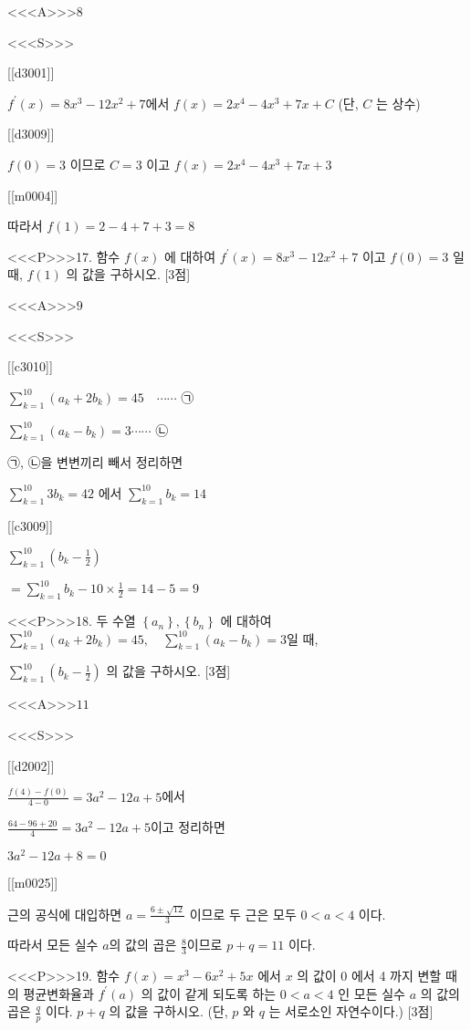 \documentclass{oblivoir}
\begin{document}
<<<A>>>$8$

<<<S>>>

[[d3001]]

$f^{\prime}(x)=8 x^{3}-12 x^{2}+7$에서
$f(x)=2 x^{4}-4 x^{3}+7 x+C $ (단, $C$ 는 상수)

[[d3009]]

$ f(0)=3 $ 이므로 $C=3 $ 이고 $ f(x)=2 x^{4}-4 x^{3}+7 x+3$ 

[[m0004]]

따라서 $f(1)=2-4+7+3=8$


<<<P>>>17. 함수 $f(x)$ 에 대하여 $f^{\prime}(x)=8 x^{3}-12 x^{2}+7$ 이고 $f(0)=3$ 일 때, $f(1)$ 의 값을 구하시오. [3점]

<<<A>>>$9$

<<<S>>>

[[c3010]]

$ \sum_{k=1}^{10}\left(a_{k}+2 b_{k}\right)=45 \quad \cdots \cdots$ ㉠

$\sum_{k=1}^{10}\left(a_{k}-b_{k}\right)=3 \cdots \cdots$ ㉡

㉠, ㉡을 변변끼리 빼서 정리하면

$\sum_{k=1}^{10} 3 b_{k}=42$ 에서 $\sum_{k=1}^{10} b_{k}=14$

[[c3009]]

$ \sum_{k=1}^{10}\left(b_{k}-\frac{1}{2}\right) $

$=\sum_{k=1}^{10} b_{k}-10 \times \frac{1}{2}=14-5=9 $


<<<P>>>18. 두 수열 $\left\{a_{n}\right\},\left\{b_{n}\right\}$ 에 대하여 $\sum_{k=1}^{10}\left(a_{k}+2 b_{k}\right)=45, \quad \sum_{k=1}^{10}\left(a_{k}-b_{k}\right)=3$일 때,

$\sum_{k=1}^{10}\left(b_{k}-\frac{1}{2}\right)$ 의 값을 구하시오. [3점]

<<<A>>>$11$

<<<S>>>

[[d2002]]

$ \frac{f(4)-f(0)}{4-0}=3 a^{2}-12 a+5$에서

$\frac{64-96+20}{4}=3 a^{2}-12 a+5 $이고 정리하면

$3 a^{2}-12 a+8=0$

[[m0025]]

근의 공식에 대입하면 $a=\frac{6 \pm \sqrt{12}}{3}$ 이므로 두 근은 모두 $0<a<4$ 이다.

따라서 모든 실수 $a$의 값의 곱은 $\frac{8}{3}$이므로 $p+q=11$ 이다.


<<<P>>>19. 함수 $f(x)=x^{3}-6 x^{2}+5 x$ 에서 $x$ 의 값이 0 에서 4 까지 변할 때의 평균변화율과 $f^{\prime}(a)$ 의 값이 같게 되도록 하는 $0<a<4$ 인 모든 실수 $a$ 의 값의 곱은 $\frac{q}{p}$ 이다. $p+q$ 의 값을 구하시오. (단, $p$ 와 $q$ 는 서로소인 자연수이다.) [3점]
\end{document}
